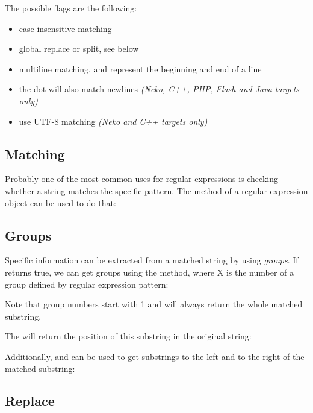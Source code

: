 The possible flags are the following:
\begin{itemize}
	\item {} case insensitive matching
	\item {} global replace or split, see below
	\item {} multiline matching, \expr{\textasciicircum} and \expr{\$} represent the beginning and end of a line
	\item {} the dot  will also match newlines \emph{(Neko, C++, PHP, Flash and Java targets only)}
	\item {} use UTF-8 matching \emph{(Neko and C++ targets only)}
\end{itemize}

\subsection{Matching}
\label{std-regex-match}

Probably one of the most common uses for regular expressions is checking whether a string matches the specific pattern. The  method of a regular expression object can be used to do that:

\subsection{Groups}
\label{std-regex-groups}

Specific information can be extracted from a matched string by using \emph{groups}. If  returns true, we can get groups using the  method, where X is the number of a group defined by regular expression pattern:


Note that group numbers start with 1 and  will always return the whole matched substring.

The  will return the position of this substring in the original string:


Additionally,  and  can be used to get substrings to the left and to the right of the matched substring:


\subsection{Replace}
\label{std-regex-replace}

